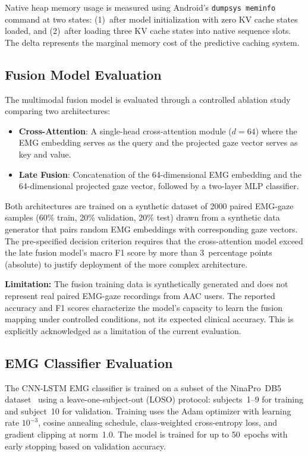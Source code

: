 \documentclass[journal]{IEEEtran}
\begin{document}
Native heap memory usage is measured using Android's \texttt{dumpsys meminfo} command at two states: (1)~after model initialization with zero KV cache states loaded, and (2)~after loading three KV cache states into native sequence slots. The delta represents the marginal memory cost of the predictive caching system.

\subsection{Fusion Model Evaluation}
\label{sec:fusion_eval}

The multimodal fusion model is evaluated through a controlled ablation study comparing two architectures:

\begin{itemize}
    \item \textbf{Cross-Attention}: A single-head cross-attention module ($d = 64$) where the EMG embedding serves as the query and the projected gaze vector serves as key and value.
    \item \textbf{Late Fusion}: Concatenation of the 64-dimensional EMG embedding and the 64-dimensional projected gaze vector, followed by a two-layer MLP classifier.
\end{itemize}

Both architectures are trained on a synthetic dataset of 2000 paired EMG-gaze samples (60\% train, 20\% validation, 20\% test) drawn from a synthetic data generator that pairs random EMG embeddings with corresponding gaze vectors. The pre-specified decision criterion requires that the cross-attention model exceed the late fusion model's macro F1 score by more than 3~percentage points (absolute) to justify deployment of the more complex architecture.

\textbf{Limitation:} The fusion training data is synthetically generated and does not represent real paired EMG-gaze recordings from AAC users. The reported accuracy and F1 scores characterize the model's capacity to learn the fusion mapping under controlled conditions, not its expected clinical accuracy. This is explicitly acknowledged as a limitation of the current evaluation.

\subsection{EMG Classifier Evaluation}
\label{sec:emg_eval}

The CNN-LSTM EMG classifier is trained on a subset of the NinaPro~DB5 dataset~\cite{ninapro} using a leave-one-subject-out (LOSO) protocol: subjects~1--9 for training and subject~10 for validation. Training uses the Adam optimizer with learning rate $10^{-3}$, cosine annealing schedule, class-weighted cross-entropy loss, and gradient clipping at norm~1.0. The model is trained for up to 50~epochs with early stopping based on validation accuracy.
\end{document}
